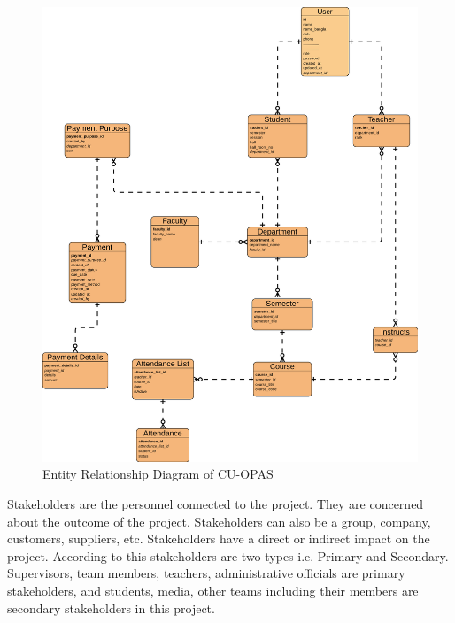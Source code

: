 \begin{figure}[H]
    \centering
    \label{fig:erd}
    \includegraphics[width=1\textwidth]{images/erd}
    \caption{Entity Relationship Diagram of CU-OPAS}
\end{figure}
Stakeholders are the personnel connected to the project. They are concerned about the outcome of the project. Stakeholders can also be a group, company, customers, suppliers, etc. Stakeholders have a direct or indirect impact on the project. According to this stakeholders are two types i.e. Primary and Secondary. Supervisors, team members, teachers, administrative officials are primary stakeholders, and students, media, other teams including their members are secondary stakeholders in this project.
\clearpage